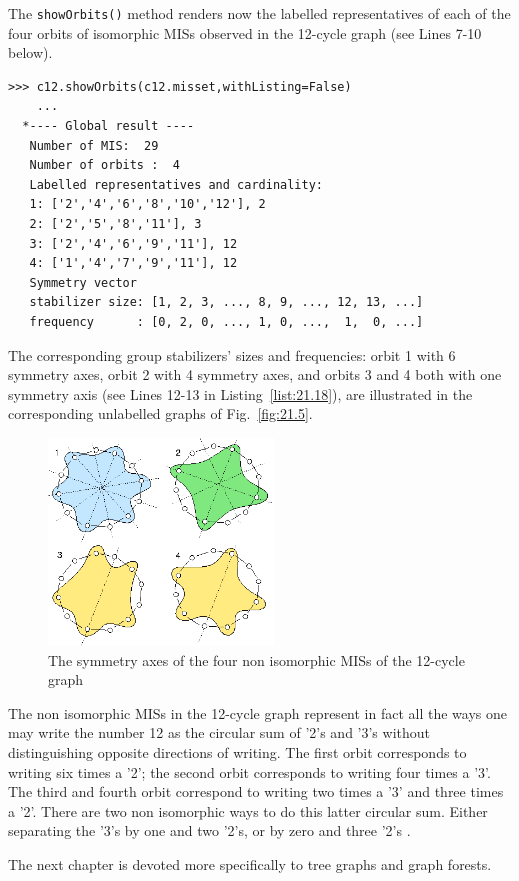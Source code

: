 The \texttt{showOrbits()} method renders now the labelled representatives of each of the four orbits of isomorphic MISs observed in the 12-cycle graph (see Lines 7-10 below).
\begin{lstlisting}[caption={Computing the MISs orbits of the 12-cycle graph},label=list:21.18]
>>> c12.showOrbits(c12.misset,withListing=False)
    ...
  *---- Global result ----
   Number of MIS:  29
   Number of orbits :  4
   Labelled representatives and cardinality:
   1: ['2','4','6','8','10','12'], 2
   2: ['2','5','8','11'], 3
   3: ['2','4','6','9','11'], 12
   4: ['1','4','7','9','11'], 12
   Symmetry vector
   stabilizer size: [1, 2, 3, ..., 8, 9, ..., 12, 13, ...]
   frequency      : [0, 2, 0, ..., 1, 0, ...,  1,  0, ...]
\end{lstlisting}
The corresponding group stabilizers' sizes and frequencies: orbit 1 with 6 symmetry axes, orbit 2 with 4 symmetry axes, and orbits 3 and 4 both with one symmetry axis (see Lines 12-13 in Listing~\vref{list:21.18}), are illustrated in the corresponding unlabelled graphs of Fig.~\vref{fig:21.5}.
\begin{figure}[h]
\sidecaption[t]
\includegraphics[width=6cm]{Figures/21-5-c12.png}
\caption{The symmetry axes of the four non isomorphic MISs of the 12-cycle graph} 
\label{fig:21.5}       %
\end{figure}

The non isomorphic MISs in the 12-cycle graph represent in fact all the ways one may write the number 12 as the circular sum of '2's and '3's without distinguishing opposite directions of writing. The first orbit corresponds to writing six times a '2'; the second orbit corresponds to writing four times a '3'. The third and fourth orbit correspond to writing two times a '3' and three times a '2'. There are two non isomorphic ways to do this latter circular sum. Either separating the '3's by one and two '2's, or by zero and three '2's \citep{ISO-2008}.

\vspace{1cm}

\noindent The next chapter is devoted more specifically to tree graphs and graph forests.

\clearpage

\typeout{}

%